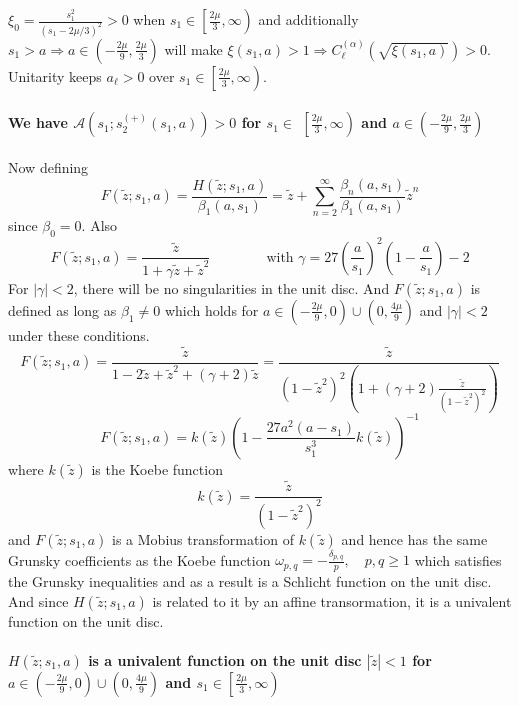 ﻿\documentclass[12pt,a4paper]{article}
\begin{document}
$\xi_{0}=\frac{s_{1}^{2}}{\left(s_{1}-2 \mu / 3\right)^{2}}>0$ when $s_{1} \in\left[\frac{2 \mu}{3}, \infty\right)$ and additionally $s_{1}>a \Rightarrow a \in\left(-\frac{2 \mu}{9}, \frac{2 \mu}{3}\right)$ will make $\xi\left(s_{1}, a\right)>1 \Rightarrow C_{\ell}^{(\alpha)}\left(\sqrt{\xi\left(s_{1}, a\right)}\right)>0$. Unitarity keeps $a_{\ell}>0$ over $s_{1} \in\left[\frac{2 \mu}{3}, \infty\right)$.\\\\
\textbf{We have $\mathcal{A}\left(s_{1} ; s_{2}^{(+)}\left(s_{1}, a\right)\right)>0$ for $s_{1} \in$ $\left[\frac{2 \mu}{3}, \infty\right)$ and $a \in\left(-\frac{2 \mu}{9}, \frac{2 \mu}{3}\right)$}\\\\
Now defining
 $$
F\left(\tilde{z} ; s_{1}, a\right)=\frac{H\left(\tilde{z} ; s_{1}, a\right)}{\beta_{1}\left(a, s_{1}\right)}=\tilde{z}+\sum_{n=2}^{\infty} \frac{\beta_{n}\left(a, s_{1}\right)}{\beta_{1}\left(a, s_{1}\right)} \tilde{z}^{n}
$$
since $\beta_{0}=0$. Also
$$
F\left(\tilde{z} ; s_{1}, a\right)=\frac{\tilde{z}}{1+\gamma \tilde{z}+\tilde{z}^{2}}\qquad \qquad \text{with }\gamma=27\left(\frac{a}{s_{1}}\right)^{2}\left(1-\frac{a}{s_{1}}\right)-2
$$
For $|\gamma|<2$, there will be no singularities in the unit disc. And $F\left(\tilde{z} ; s_{1}, a\right)$ is defined as long as $\beta_{1}\neq 0$ which holds for $a \in\left(-\frac{2 \mu}{9}, 0\right) \cup\left(0, \frac{4 \mu}{9}\right)$ and $|\gamma|<2$ under these conditions. 
$$
F\left(\tilde{z} ; s_{1}, a\right)=\frac{\tilde{z}}{1-2 \tilde{z}+\tilde{z}^{2}+(\gamma+2) \tilde{z}}=\frac{\tilde{z}}{(1-\tilde{z}^{2})^{2}\left(1+(\gamma+2)\frac{ \tilde{z}}{(1-\tilde{z}^{2})^{2}}\right)}
$$
$$
F\left(\tilde{z} ; s_{1}, a\right)=k(\tilde{z})\left(1-\frac{27 a^{2}\left(a-s_{1}\right)}{s_{1}^{3}} k(\tilde{z})\right)^{-1}
$$
where $k(\tilde{z})$ is the Koebe function 
$$
k(\tilde{z})=\frac{\tilde z}{(1-\tilde{z}^{2})^{2}}
$$
and $F\left(\tilde{z} ; s_{1}, a\right)$ is a Mobius transformation of $k(\tilde{z})$ and hence has the same Grunsky coefficients as the Koebe function $\omega_{p, q}=-\frac{\delta_{p, q}}{p}, \quad p, q \geq 1$ which satisfies the Grunsky inequalities and as a result is a Schlicht function on the unit disc. And since $H\left(\tilde{z} ; s_{1}, a\right)$ is related to it by an affine transormation, it is a univalent function on the unit disc.\\\\
\textbf{$H\left(\tilde{z} ; s_{1}, a\right)$ is a univalent function on the unit disc $|\tilde{z}|<1$ for $a \in\left(-\frac{2 \mu}{9}, 0\right) \cup\left(0, \frac{4 \mu}{9}\right)$ and $s_{1} \in\left[\frac{2 \mu}{3}, \infty\right)$}\\\\
\end{document}
